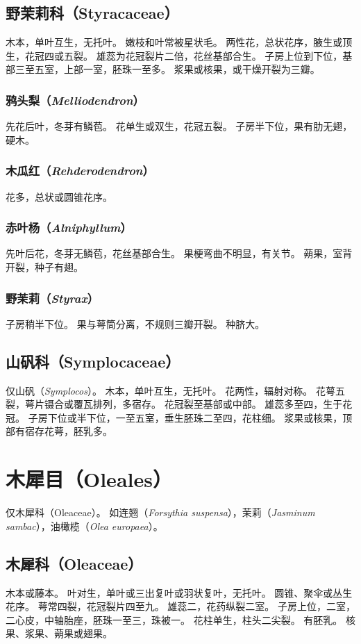 \documentclass[11pt]{article}
\begin{document}
\begin{sloppypar}
\subsection{野茉莉科（Styracaceae）}
木本，单叶互生，无托叶。
嫩枝和叶常被星状毛。
两性花，总状花序，腋生或顶生，花冠四或五裂。
雄蕊为花冠裂片二倍，花丝基部合生。
子房上位到下位，基部三至五室，上部一室，胚珠一至多。
浆果或核果，或干燥开裂为三瓣。

\subsubsection{鸦头梨（\textit{Melliodendron}）}
先花后叶，冬芽有鳞苞。
花单生或双生，花冠五裂。
子房半下位，果有肋无翅，硬木。

\subsubsection{木瓜红（\textit{Rehderodendron}）}
花多，总状或圆锥花序。

\subsubsection{赤叶杨（\textit{Alniphyllum}）}
先叶后花，冬芽无鳞苞，花丝基部合生。
果梗弯曲不明显，有关节。
蒴果，室背开裂，种子有翅。

\subsubsection{野茉莉（\textit{Styrax}）}
子房稍半下位。
果与萼筒分离，不规则三瓣开裂。
种脐大。

\subsection{山矾科（Symplocaceae）}
仅山矾（\textit{Symplocos}）。
木本，单叶互生，无托叶。
花两性，辐射对称。
花萼五裂，萼片镊合或覆瓦排列，多宿存。
花冠裂至基部或中部。
雄蕊多至四，生于花冠。
子房下位或半下位，一至五室，垂生胚珠二至四，花柱细。
浆果或核果，顶部有宿存花萼，胚乳多。

\section{木犀目（Oleales）}
仅木犀科（Oleaceae）。
如连翘（\textit{Forsythia suspensa}），茉莉（\textit{Jasminum sambac}），油橄榄（\textit{Olea europaea}）。

\subsection{木犀科（Oleaceae）}
木本或藤本。
叶对生，单叶或三出复叶或羽状复叶，无托叶。
圆锥、聚伞或丛生花序。
萼常四裂，花冠裂片四至九。
雄蕊二，花药纵裂二室。
子房上位，二室，二心皮，中轴胎座，胚珠一至三，珠被一。
花柱单生，柱头二尖裂。
有胚乳。
核果、浆果、蒴果或翅果。


\end{sloppypar}
\end{document}
